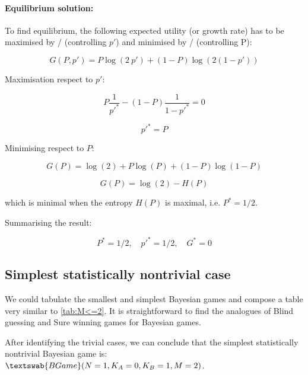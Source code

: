 \documentclass{article}
\theoremstyle{definition}
\newcommand{\BG}[1]{$\textswab{BGame}(#1)$}
\begin{document}
\paragraph{Equilibrium solution:}

To find equilibrium, the following expected utility (or growth rate) has to be maximised by \PI/ (controlling $p'$) and minimised by \PII/ (controlling P):

\begin{equation}
    G(P,p') = P \log(2 \ p') + (1-P) \log (2 (1-p'))
\end{equation}

Maximisation respect to $p'$:

\begin{equation}
    P \frac{1}{p'^*} - (1-P) \frac{1}{1-p'^*} = 0
\end{equation}

\begin{equation}
    p'^* = P
\end{equation}

Minimising respect to $P$:

\begin{equation}
    G(P) = \log(2) + P \log(P) + (1-P) \log (1-P)
\end{equation}

\begin{equation}
    G(P) = \log(2) - H(P)
\end{equation}

which is minimal when the entropy $H(P)$ is maximal, i.e. $P^*=1/2$.

Summarising the result:

\begin{equation}
    P^* = 1/2, \quad p'^* = 1/2, \quad G^* = 0
\end{equation}

\subsection{Simplest statistically nontrivial case}
\label{sec:SimplestNontrivialBayesian}

We could tabulate the smallest and simplest Bayesian games and compose a table very similar to \ref{tab:M<=2}.
It is straightforward to find the analogues of Blind guessing and Sure winning games for Bayesian games. 

After identifying the trivial cases, we can conclude that the simplest statistically nontrivial Bayesian game is:
\BG{N=1,K_A=0,K_B=1,M=2}.
\end{document}
